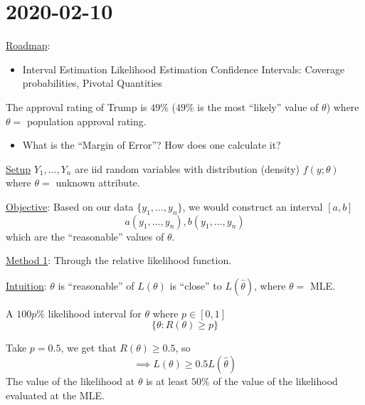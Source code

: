 \section{2020-02-10}
\underline{Roadmap}:
\begin{itemize}
    \item Interval Estimation
          \subitem Likelihood Estimation
          \subitem Confidence Intervals: Coverage probabilities, Pivotal Quantities
\end{itemize}
\begin{exbox}
    \begin{example}
        The approval rating of Trump is $ 49\% $ ($ 49\% $ is the most ``likely'' value of $ \theta $)
        where $ \theta= $ population approval rating.
        \begin{itemize}
            \item What is the ``Margin of Error''?
                  \subitem How does one calculate it?
        \end{itemize}
    \end{example}
\end{exbox}
\underline{Setup} $ Y_1,\ldots ,Y_n $ are iid random variables with
distribution (density) $ f(y;\theta) $ where $ \theta= $ unknown attribute.

\underline{Objective}: Based on our data $ \{y_1,\ldots ,y_n\} $, we would
construct an interval $ [a,b] $
\[ a(y_1,\ldots ,y_n),b(y_1,\ldots ,y_n) \]
which are the ``reasonable'' values of $ \theta $.

\underline{Method 1}: Through the relative likelihood function.

\underline{Intuition}: $ \theta $ is ``reasonable'' of $ L(\theta) $
is ``close'' to $ L(\hat{\theta}) $, where $ \theta= $ MLE.

\begin{defbox}
    \begin{definition}
        A $ 100p\% $ likelihood interval for $ \theta $ where $ p\in[0,1] $
        \[ \{\theta:R(\theta)\geqslant p\} \]
    \end{definition}
\end{defbox}
Take $ p=0.5 $, we get that $ R(\theta)\geqslant 0.5 $, so
\[ \implies L(\theta)\geqslant 0.5 L(\hat{\theta}) \]
The value of the likelihood at $ \theta $ is at least $ 50\% $ of the value of the
likelihood evaluated at the MLE.

